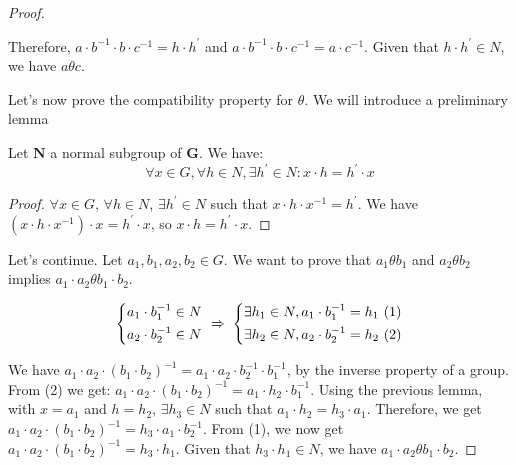 \begin{example}
\begin{enumerate}
\begin{proof}
\begin{enumerate}
      Therefore, $a \cdot b^{-1} \cdot b \cdot c^{-1} = h \cdot h^{'}$ and
      $a \cdot b^{-1} \cdot b \cdot c^{-1} = a \cdot c^{-1}$. Given that
      $h \cdot h^{'} \in N$, we have $a \theta c$.
    \end{enumerate}

    Let's now prove the compatibility property for $\theta$. We will introduce a preliminary lemma
    \begin{lemma}
      Let $\boldsymbol{N}$ a normal subgroup of $\boldsymbol{G}$. We have:
      \begin{equation}
        \forall x \in G, \forall h \in N, \exists h^{'} \in N: x \cdot h = h^{'} \cdot x
      \end{equation}
    \end{lemma}

    \begin{proof}
      $\forall x \in G$, $\forall h \in N$, $\exists h^{'} \in N$ such that
      $x \cdot h \cdot x^{-1} = h^{'}$.  We have
      $( x \cdot h \cdot x^{-1} ) \cdot x = h^{'} \cdot x$, so $x \cdot h = h^{'} \cdot x$.
    \end{proof}

    Let's continue. Let $a_1, b_1, a_2, b_2 \in G$. We want to prove that
    $a_1 \theta b_1$ and $a_2 \theta b_2$ implies $a_1 \cdot a_2 \theta b_1 \cdot b_2$.

    \begin{equation}
      \begin{dcases}
        a_1 \cdot b_1^{-1} \in N   \\
        a_2 \cdot b_2^{-1} \in N \end{dcases}
      \; \xRightarrow{} \;
      \begin{dcases}
        \exists h_1 \in N, a_1 \cdot b_1^{-1} = h_1 \text{ (1)} \\
        \exists h_2 \in N, a_2 \cdot b_2^{-1} = h_2 \text{ (2)}\end{dcases}
    \end{equation}

    We have
    $a_1 \cdot a_2 \cdot (b_1 \cdot b_2)^{-1} = a_1 \cdot a_2 \cdot b_2^{-1}
    \cdot b_1^{-1}$, by the inverse property of a group. From (2) we get:
    $a_1 \cdot a_2 \cdot (b_1 \cdot b_2)^{-1} = a_1 \cdot h_2 \cdot
    b_1^{-1}$. Using the previous lemma, with $x = a_1$ and $h = h_2$,
    $\exists h_3 \in N$ such that $a_1 \cdot h_2 = h_3 \cdot a_1$. Therefore, we get
    $a_1 \cdot a_2 \cdot (b_1 \cdot b_2)^{-1} = h_3 \cdot a_1 \cdot
    b_2^{-1}$. From (1), we now get
    $a_1 \cdot a_2 \cdot (b_1 \cdot b_2)^{-1} = h_3 \cdot h_1$. Given that
    $h_3 \cdot h_1 \in N$, we have $a_1 \cdot a_2 \theta b_1 \cdot b_2$.


\end{proof}
\end{enumerate}
\end{example}
